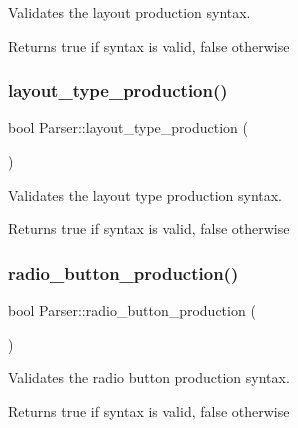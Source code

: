 Validates the layout production syntax. \begin{DoxyReturn}{Returns}
true if syntax is valid, false otherwise 
\end{DoxyReturn}
\hypertarget{class_parser_a7a248c83d07922badb615458a943d5dc}{}\label{class_parser_a7a248c83d07922badb615458a943d5dc} 
\subsubsection{\texorpdfstring{layout\+\_\+type\+\_\+production()}{layout\_type\_production()}}
{\footnotesize\ttfamily bool Parser\+::layout\+\_\+type\+\_\+production (\begin{DoxyParamCaption}{ }\end{DoxyParamCaption})\hspace{0.3cm}{\ttfamily [private]}}

Validates the layout type production syntax. \begin{DoxyReturn}{Returns}
true if syntax is valid, false otherwise 
\end{DoxyReturn}
\hypertarget{class_parser_a67083b88f1f2755a7ea81830524c1551}{}\label{class_parser_a67083b88f1f2755a7ea81830524c1551} 
\subsubsection{\texorpdfstring{radio\+\_\+button\+\_\+production()}{radio\_button\_production()}}
{\footnotesize\ttfamily bool Parser\+::radio\+\_\+button\+\_\+production (\begin{DoxyParamCaption}{ }\end{DoxyParamCaption})\hspace{0.3cm}{\ttfamily [private]}}

Validates the radio button production syntax. \begin{DoxyReturn}{Returns}
true if syntax is valid, false otherwise 
\end{DoxyReturn}
\hypertarget{class_parser_a3cd45dd7f2cf5d84955ac8efca423073}{}\label{class_parser_a3cd45dd7f2cf5d84955ac8efca423073} 
